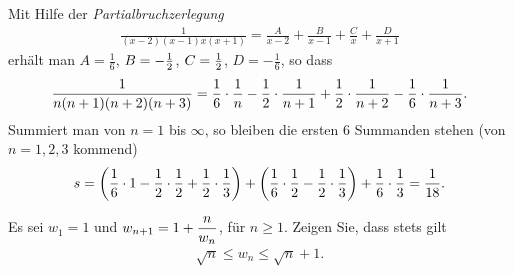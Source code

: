 \documentclass[11pt,a4paper]{article}
\begin{document}
\begin{loesung} Mit Hilfe der \emph{Partialbruchzerlegung} 
\begin{gather*}
\frac{1}{(x-2)(x-1)x(x+1)} =\frac{A}{x-2} +\frac{B}{x-1} +\frac{C}{x}
+\frac{D}{x+1}
\end{gather*}
erhält man $A=\frac{1}{6}$, $B=-\frac{1}{2}$, $C=\frac{1}{2}$, $D=-\frac{1}{6}$, so dass
\begin{gather*}
\frac{1}{n(n+1)(n+2)(n+3)}=\frac{1}{6}\cdot\frac{1}{n} -\frac{1}{2}\cdot\frac{1}{n+1}
  +\frac{1}{2}\cdot\frac{1}{n+2} -\frac{1}{6}\cdot\frac{1}{n+3}.
\end{gather*}
Summiert man von $n=1$ bis $\infty$, so bleiben die ersten 6 Summanden stehen
(von $n=1,2,3 $ kommend)
\begin{gather*}
s=\left(\frac{1}{6}\cdot1 -\frac{1}{2}\cdot\frac{1}{2} +\frac{1}{2}\cdot\frac{1}{3}\right)
+\left(\frac{1}{6}\cdot\frac{1}{2} -\frac{1}{2}\cdot\frac{1}{3}\right) +\frac{1}{6}\cdot\frac{1}{3} =
\frac{1}{18}.
\end{gather*}
\end{loesung}

\begin{aufgabe}
Es sei $w_1=1$ und $\displaystyle w_{n+1}= 1 +\frac{n}{w_n}$, für $n\ge 1$.  Zeigen Sie,
dass stets gilt
\begin{gather*}
\sqrt{n} \le w_n \le \sqrt{n}+1.
\end{gather*}
\end{aufgabe}
\end{document}
